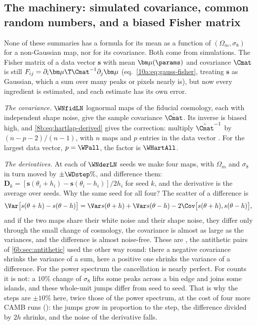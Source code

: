 \subsection{The machinery: simulated covariance, common random numbers, and a biased Fisher matrix}
\label{12w:sec:mc-fisher}

None of these summaries has a formula for its mean as a function of $(\Omega_m,\sigma_8)$ for a non-Gaussian map,
nor for its covariance. Both come from simulations. The Fisher matrix of a data vector $\bm s$ with mean
$\bm\mu(\params)$ and covariance $\Cmat$ is still $F_{ij}=\partial_i\bm\mu\T\Cmat^{-1}\partial_j\bm\mu$
(eq.~\ref{10a:eq:gauss-fisher}, treating $\bm s$ as Gaussian, which a sum over many peaks or pixels nearly is), but now
every ingredient is estimated, and each estimate has its own error.

\emph{The covariance.} $\WNfidLN$ lognormal maps of the fiducial cosmology, each with independent shape noise, give
the sample covariance $\hat\Cmat$. Its inverse is biased high, and \eqref{8b:eq:hartlap-derived} gives the correction:
multiply $\hat\Cmat^{-1}$ by $(n-p-2)/(n-1)$, with $n$ maps and $p$ entries in the data vector \cite{Hartlap2007}. For
the largest data vector, $p=\WPall$, the factor is $\WHartAll$.

\emph{The derivatives.} At each of $\WNderLN$ seeds we make four maps, with $\Omega_m$ and $\sigma_8$ in turn moved by
$\pm\WDstep\%$, and difference them: $\bm D_k=[\bm s(\theta_i+h_i)-\bm s(\theta_i-h_i)]/2h_i$ for seed $k$, and the
derivative is the average over seeds. Why the same seed for all four? The scatter of a difference is
\begin{equation}
\Var\bigl[s(\theta+h)-s(\theta-h)\bigr]=\Var s(\theta+h)+\Var s(\theta-h)-2\Cov\bigl[s(\theta+h),s(\theta-h)\bigr],
\label{12w:eq:crn}
\end{equation}
and if the two maps share their white noise and their shape noise, they differ only through the small change of
cosmology, the covariance is almost as large as the variances, and the difference is almost noise-free. These are
, the antithetic pairs of \cref{6b:sec:antithetic} used the other way round: there
a negative covariance shrinks the variance of a sum, here a positive one shrinks the variance of a difference. For the power spectrum the
cancellation is nearly perfect. For counts it is not: a $10\%$ change of $\sigma_8$ lifts some peaks across a bin
edge and joins some islands, and these whole-unit jumps differ from seed to seed. That is why the steps are
$\pm10\%$ here, twice those of the power spectrum, at the cost of four more CAMB runs (): the
jumps grow in proportion to the step, the difference divided by $2h$ shrinks, and the noise of the derivative falls.

